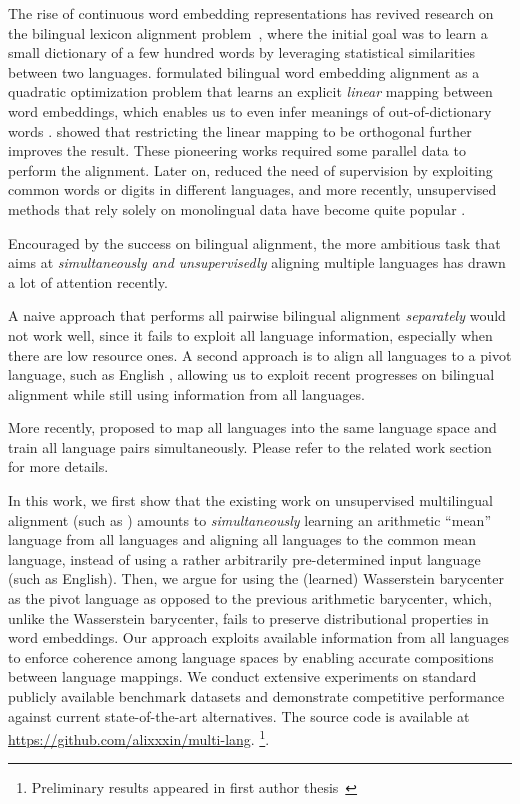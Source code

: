 \documentclass{article}
\begin{document}
The rise of continuous word embedding representations has revived research on the bilingual lexicon alignment problem~\cite{Rapp:1995:IWT:981658.981709,fung1995compiling},
where the initial goal was to learn a small dictionary of a few hundred words by leveraging statistical similarities between two languages. 
\citet{MikolovLS13} formulated bilingual word embedding alignment as a quadratic optimization problem that learns an explicit \emph{linear} mapping between word embeddings, which enables us to even infer meanings of out-of-dictionary words 
\cite{zhang2016ten,Dinu2014ImprovingZL,MikolovLS13}.
\citet{Xing2015NormalizedWE} showed that restricting the linear mapping to be orthogonal further improves the result. These pioneering works required some parallel data to perform the alignment. Later on, \cite{smith2017offline,ArtetxeLA17,ArtetxeLA18b} reduced the need of supervision by exploiting common words or digits in different languages, and more recently, unsupervised methods that rely solely on monolingual data have become quite popular \cite{GouwsBC15,ZhangLLS17a,ZhangLLS17b,LampleCRDJ18,ArtetxeLA18a,DouZH18,HoshenWolf18,GraveJB19}.

Encouraged by the success on bilingual alignment, the more ambitious task that aims at \emph{simultaneously and unsupervisedly} aligning multiple languages has drawn a lot of attention recently. 

A naive approach that performs all pairwise bilingual alignment \emph{separately} would not work well, since it fails to exploit all language information, especially when there are low resource ones. 
A second approach is to align all languages to a pivot language, such as English \cite{smith2017offline},  allowing us to exploit recent progresses on bilingual alignment while still using information from all languages. 

More recently, \cite{ChenCardie18,TaitelbaumCG19a,TaitelbaumCG19b,AlauxGCJ19,WadaIM19} proposed to map all languages into the same language space and train all language pairs simultaneously. Please refer to the related work section for more details.


 In this work, we first show that the existing work on unsupervised multilingual alignment (such as \cite{AlauxGCJ19}) amounts to \emph{simultaneously} learning an arithmetic ``mean'' language from all languages and aligning all languages to the common mean language, instead of using a rather arbitrarily pre-determined input language (such as English). Then, we argue for using the (learned) Wasserstein barycenter as the pivot language as opposed to the previous arithmetic barycenter, which, unlike the Wasserstein barycenter, fails to preserve distributional properties in word embeddings.  Our approach exploits available information from all languages to enforce coherence among language spaces by enabling accurate compositions between language mappings. We conduct extensive experiments on standard publicly available benchmark datasets and demonstrate competitive performance against current state-of-the-art alternatives. 
 The source code is available at \url{https://github.com/alixxxin/multi-lang}. \footnote{Preliminary results appeared in first author thesis~\cite{Lian2020}}.
\end{document}
